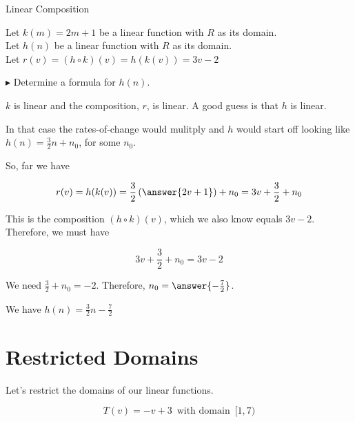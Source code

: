 \documentclass{ximera}
\begin{document}
\begin{example} Linear Composition

Let $k(m) = 2 m + 1$ be a linear function with \textbf{$R$} as its domain. \\
Let $h(n)$ be a linear function with \textbf{$R$} as its domain. \\


Let $r(v) = (h \circ k)(v) = h(k(v)) = 3 v - 2$ 

$\blacktriangleright$  Determine a formula for $h(n)$.




\begin{explanation}


$k$ is linear and the composition, $r$, is linear. A good guess is that $h$ is linear.  

In that case the rates-of-change would mulitply and $h$ would start off looking like $h(n) = \frac{3}{2} n + n_0$, for some $n_0$.


So, far we have 

\[   r(v) = h(k(v)) = \frac{3}{2} \left( \answer{2 v + 1} \right) + n_0 =  3 v + \frac{3}{2} + n_0\]


This is the composition $(h \circ k)(v)$, which we also know equals $3 v - 2$.  Therefore, we must have 

\[
3 v + \frac{3}{2} + n_0  = 3 v - 2
\]


We need $\frac{3}{2} + n_0 = -2$.  Therefore, $n_0 = \answer{-\frac{7}{2}}$.


We have $h(n) = \frac{3}{2} n - \frac{7}{2}$


\end{explanation}
\end{example}








\section{Restricted Domains}


Let's restrict the domains of our linear functions.









\[  T(v) = -v+3  \, \text{ with domain } \,  [1,7)   \]
\end{document}
